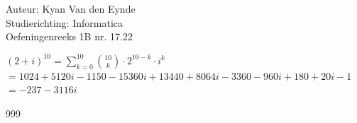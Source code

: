 \documentclass[a4paper]{article}
\begin{document}
  
\noindent \large Auteur: Kyan Van den Eynde \\
\noindent \large Studierichting: Informatica\\
\noindent \large Oefeningenreeks 1B nr. 17.22\\

\medskip

\normalsize

$(2 + i)^{10} = \displaystyle\sum_{k=0}^{10} \binom{10}{k} \cdot 2^{10-k} \cdot i^k$\\

$=1024+5120i-1150-15360i+13440+8064i-3360-960i+180+20i-1$\\

$=-237-3116i$\\

\begin{thebibliography}{999}
\end{thebibliography}
\end{document}
